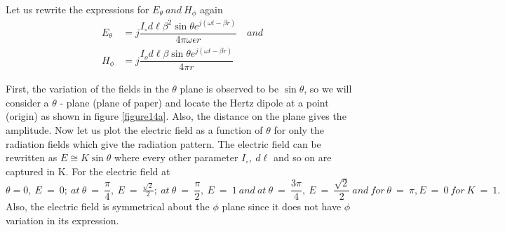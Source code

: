 \paragraph{}
Let us rewrite the expressions for $E_\theta \ and \ H_\phi$ again
\begin{align*}
E_\theta &= j\dfrac{I_\circ d\ell\beta^2\sin\theta e^{j(\omega t - \beta r)}}{4\pi\omega\epsilon r} \quad and 
\\
H_\phi &= j\dfrac{I_od\ell\beta\sin\theta e^{j(\omega t - \beta r)}}{4\pi r}
\end{align*}

First, the variation of the fields in the $\theta$ plane is observed to be $\sin\theta$, so we will consider a $\theta$ - plane (plane of paper) and locate the Hertz dipole at a point (origin) as shown in figure \ref{figure14a}. Also, the distance on the plane gives the amplitude. Now let us plot the electric field as a function of $\theta$ for only the radiation fields which give the radiation pattern. The electric field can be rewritten as $E \cong K\sin\theta$ where every other parameter $I_\circ, \ d\ell$ and so on are captured in K. For the electric field at $\theta = 0,\ E\ =\ 0;\ at\ \theta\ =\ \dfrac{\pi}{4},\ E\ =\ \frac{\sqrt{2}}{2};\ at\ \theta\ =\ \dfrac{\pi}{2},\ E\ =\ 1\ and\ at\ \theta\ =\ \dfrac{3\pi}{4},\ E\ =\ \dfrac{\sqrt{2}}{2}\ and\ for\ \theta\ =\ \pi, E\ =\ 0\ for\ K\ =\ 1. $
Also, the electric field is symmetrical about the $\phi$ plane since it does not have $\phi$ variation in its expression. 
